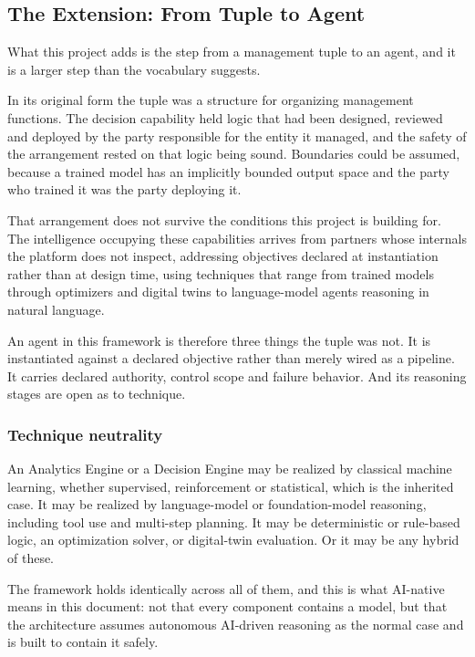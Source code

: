 \hypertarget{the-extension-from-tuple-to-agent}{%
\subsection{The Extension: From Tuple to Agent}\label{the-extension-from-tuple-to-agent}}

What this project adds is the step from a management tuple to an agent,
and it is a larger step than the vocabulary suggests.

In its original form the tuple was a structure for organizing management
functions. The decision capability held logic that had been designed,
reviewed and deployed by the party responsible for the entity it
managed, and the safety of the arrangement rested on that logic being
sound. Boundaries could be assumed, because a trained model has an
implicitly bounded output space and the party who trained it was the
party deploying it.

That arrangement does not survive the conditions this project is
building for. The intelligence occupying these capabilities arrives from
partners whose internals the platform does not inspect, addressing
objectives declared at instantiation rather than at design time, using
techniques that range from trained models through optimizers and digital
twins to language-model agents reasoning in natural language.

An agent in this framework is therefore three things the tuple was not.
It is instantiated against a declared objective rather than merely wired
as a pipeline. It carries declared authority, control scope and failure
behavior. And its reasoning stages are open as to technique.

\hypertarget{technique-neutrality}{%
\subsubsection{Technique neutrality}\label{technique-neutrality}}

An Analytics Engine or a Decision Engine may be realized by classical
machine learning, whether supervised, reinforcement or statistical,
which is the inherited case. It may be realized by language-model or
foundation-model reasoning, including tool use and multi-step planning.
It may be deterministic or rule-based logic, an optimization solver, or
digital-twin evaluation. Or it may be any hybrid of these.

The framework holds identically across all of them, and this is what
AI-native means in this document: not that every component contains a
model, but that the architecture assumes autonomous AI-driven reasoning
as the normal case and is built to contain it safely.

